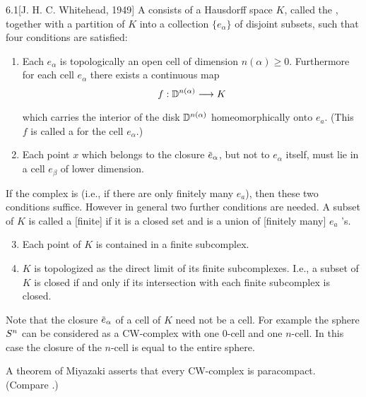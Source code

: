 \documentclass[../main]{subfiles}
\begin{document}
\begin{customdef}{6.1}[J. H. C. Whitehead, 1949]
\label{def:06.01}
A  consists of a Hausdorff space $K$, called the , together with a partition of $K$ into a collection $\{e_{\alpha}\}$ of disjoint subsets, such that four conditions are satisfied:
\begin{enumerate}[label=\arabic*)]
	\item Each $e_{\alpha}$ is topologically an open cell of dimension $n(\alpha) \geq 0$. Furthermore for each cell $e_{\alpha}$ there exists a continuous map
    \[
    f:{\disk^{n(\alpha)}}\varrightarrow{} K
    \]
    which carries the interior of the disk $\mathbb{D}^{n(\alpha)}$ homeomorphically onto $e_{a}$. (This $f$ is called a  for the cell $e_{\alpha}$.)
    \item Each point $x$ which belongs to the closure $\xoverline{e}_{\alpha}$, but not to $e_{\alpha}$ itself, must lie in a cell $e_\beta$ of lower dimension.
\end{enumerate}
If the complex is  (i.e., if there are only finitely many $e_{a}$), then these two conditions suffice. However in general two further conditions are needed. A subset of $K$ is called a [finite]  if it is a closed set and is a union of [finitely many] $e_{a}$ 's.
\begin{enumerate}[label=\arabic*)]
	\setcounter{enumi}{2}
	\item {} Each point of $K$ is contained in a finite subcomplex.
	\item {} $K$ is topologized as the direct limit of its finite subcomplexes. I.e., a subset of $K$ is closed if and only if its intersection with each finite subcomplex is closed.
\end{enumerate}
\end{customdef}
Note that the closure $\xoverline{e}_{\alpha}$ of a cell of $K$ need not be a cell. For example the sphere $S^{n}$ can be considered as a CW-complex with one $0$-cell and one $n$-cell. In this case the closure of the $n$-cell is equal to the entire sphere.

A theorem of Miyazaki \cite{miyazaki1952} asserts that every CW-complex is paracompact. (Compare \cite[p.~419]{dugundji1966}.)
\end{document}
